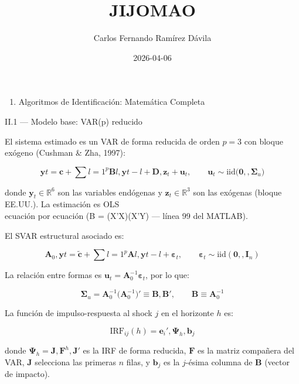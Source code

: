 \documentclass[
]{article}
\title{JIJOMAO}
\author{Carlos Fernando Ramírez Dávila}
\date{2026-04-06}
\providecommand{\tightlist}{%
  \setlength{\itemsep}{0pt}\setlength{\parskip}{0pt}}
\begin{document}
\maketitle

\begin{enumerate}
\def\labelenumi{\Roman{enumi}.}
\setcounter{enumi}{1}
\tightlist
\item
  Algoritmos de Identificación: Matemática Completa
\end{enumerate}

II.1 --- Modelo base: VAR(p) reducido

El sistema estimado es un VAR de forma reducida de orden \(p=3\) con
bloque exógeno (Cushman \& Zha, 1997):

\[\mathbf{y}t = \mathbf{c} + \sum{l=1}^{p} \mathbf{B}l,\mathbf{y}{t-l} + \mathbf{D},\mathbf{z}_t + \mathbf{u}_t, \qquad \mathbf{u}_t \sim
  \text{iid}\bigl(\mathbf{0},,\boldsymbol{\Sigma}_u\bigr)\]

donde \(\mathbf{y}_t \in \mathbb{R}^6\) son las variables endógenas y
\(\mathbf{z}_t \in \mathbb{R}^3\) son las exógenas (bloque EE.UU.). La
estimación es OLS\\
ecuación por ecuación (B = (X'X)(X'Y) --- línea 99 del MATLAB).

El SVAR estructural asociado es:

\[\mathbf{A}_0,\mathbf{y}t = \tilde{\mathbf{c}} + \sum{l=1}^{p}\mathbf{A}l,\mathbf{y}{t-l} + \boldsymbol{\varepsilon}_t, \qquad \boldsymbol{\varepsilon}_t \sim   
  \text{iid}(\mathbf{0},,\mathbf{I}_n)\]

La relación entre formas es
\(\mathbf{u}_t = \mathbf{A}_0^{-1}\boldsymbol{\varepsilon}_t\), por lo
que:

\[\boldsymbol{\Sigma}_u = \mathbf{A}_0^{-1}\bigl(\mathbf{A}_0^{-1}\bigr)' \equiv \mathbf{B},\mathbf{B}', \qquad \mathbf{B} \equiv \mathbf{A}_0^{-1}\]

La función de impulso-respuesta al shock \(j\) en el horizonte \(h\) es:

\[\text{IRF}_{ij}(h) = \mathbf{e}_i',\boldsymbol{\Psi}_h,\mathbf{b}_j\]

donde \(\boldsymbol{\Psi}_h = \mathbf{J},\mathbf{F}^h,\mathbf{J}'\) es
la IRF de forma reducida, \(\mathbf{F}\) es la matriz compañera del VAR,
\(\mathbf{J}\) selecciona las primeras \(n\) filas, y \(\mathbf{b}_j\)
es la \(j\)-ésima columna de \(\mathbf{B}\) (vector de impacto).
\end{document}
